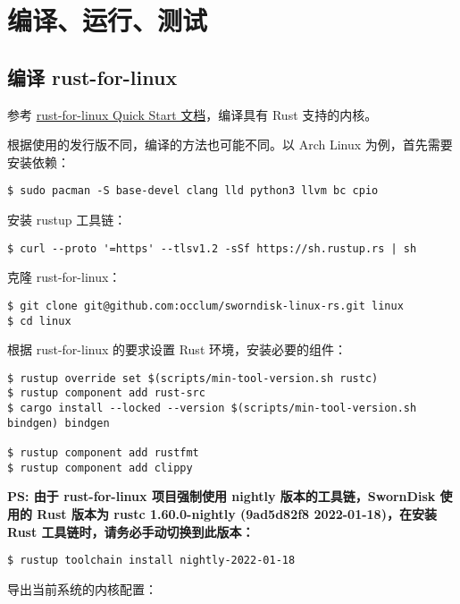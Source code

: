 \clearpage
\section{编译、运行、测试}

\subsection{编译 rust-for-linux}

参考 \href{https://github.com/Rust-for-Linux/linux/blob/rust/Documentation/rust/quick-start.rst}{rust-for-linux Quick Start 文档}，编译具有 Rust 支持的内核。

根据使用的发行版不同，编译的方法也可能不同。以 Arch Linux 为例，首先需要安装依赖：

\begin{verbatim}
$ sudo pacman -S base-devel clang lld python3 llvm bc cpio
\end{verbatim}

安装 rustup 工具链：

\begin{verbatim}
$ curl --proto '=https' --tlsv1.2 -sSf https://sh.rustup.rs | sh
\end{verbatim}

克隆 rust-for-linux：

\begin{verbatim}
$ git clone git@github.com:occlum/sworndisk-linux-rs.git linux
$ cd linux
\end{verbatim}

根据 rust-for-linux 的要求设置 Rust 环境，安装必要的组件：

\begin{verbatim}
$ rustup override set $(scripts/min-tool-version.sh rustc)
$ rustup component add rust-src
$ cargo install --locked --version $(scripts/min-tool-version.sh bindgen) bindgen

$ rustup component add rustfmt
$ rustup component add clippy
\end{verbatim}

\textbf{PS: 由于 rust-for-linux 项目强制使用 nightly 版本的工具链，SwornDisk 使用的 Rust 版本为 rustc 1.60.0-nightly (9ad5d82f8 2022-01-18)，在安装 Rust 工具链时，请务必手动切换到此版本：}

\begin{verbatim}
$ rustup toolchain install nightly-2022-01-18
\end{verbatim}

导出当前系统的内核配置：

